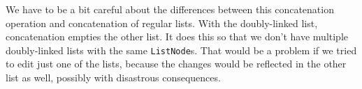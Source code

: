 We have to be a bit careful about the differences between this concatenation operation and concatenation of regular lists.  With the doubly-linked list, concatenation empties the other list.  It does this so that we don’t have multiple doubly-linked lists with the same \texttt{ListNode}s.    That would be a problem if we tried to edit just one of the lists, because the changes would be reflected in the other list as well, possibly with disastrous consequences.

